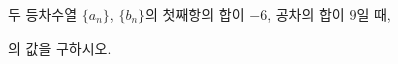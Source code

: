 두 등차수열 $\{a_n\}$, $\{b_n\}$의 첫째항의 합이 $-6$, 공차의 합이 $9$일 때,\par\smallskip{}\par\smallskip\noindent 의 값을 구하시오.
